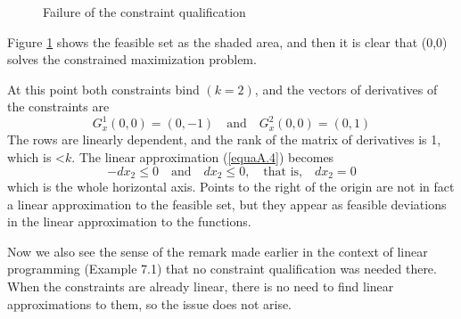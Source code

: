 \begin{appendices}
\begin{figure}[!htb]
\caption{Failure of the constraint qualification} %
\label{FigA.1} %
\end{figure}
Figure \ref{FigA.1} shows the feasible set as the shaded area, and then it is clear that (0,0) solves the constrained maximization problem.

At this point both constraints bind $(k=2)$, and the vectors of derivatives of the constraints are
\begin{equation*}
G_x^1(0,0) = (0,-1) \quad \mbox{and} \quad G_x^2(0,0) = (0,1)
\end{equation*}
The rows are linearly dependent, and the rank of the matrix of derivatives is 1, which is <$k$. The linear approximation (\ref{equaA.4}) becomes
\begin{equation*}
 -dx_2 \leq 0 \quad \mbox{and} \quad dx_2 \leq 0, \quad \mbox{that is,} \quad dx_2=0
\end{equation*}
which is the whole horizontal axis. Points to the right of the origin are not in fact a linear approximation to the feasible set, but they appear as feasible deviations in the linear approximation to the functions.

Now we also see the sense of the remark made earlier in the context of linear programming (Example 7.1) that no constraint qualification was needed there. When the constraints are already linear, there is no need to find linear approximations to them, so the issue does not arise.
\begin{figure}[!htb] %
\centering %
\end{figure}
\end{appendices}
